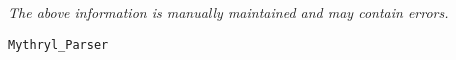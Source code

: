 \label{pkg:mythryl\_parser}

{\tiny \it The above information is manually maintained and may contain errors.}
\begin{verbatim}
Mythryl_Parser
\end{verbatim}
